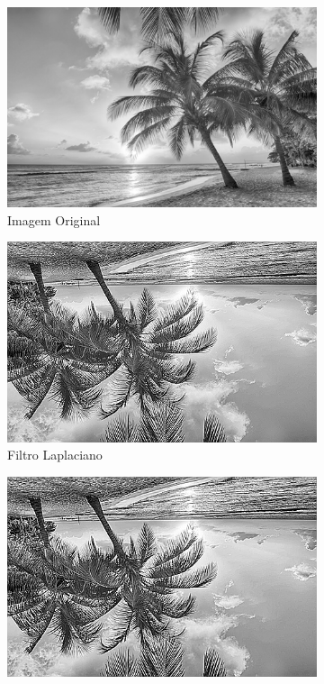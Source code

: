 \documentclass{article}
\begin{document}
\begin{figure}[H]
    \centering
    \begin{subfigure}[b]{0.3\textwidth}
        \includegraphics[width=\textwidth]{../imags/praia.png}
        \caption{Imagem Original}
        \label{fig:original_praia}
    \end{subfigure}
    \hfill
    \begin{subfigure}[b]{0.3\textwidth}
        \includegraphics[width=\textwidth, angle=180]{../imags/praia_laplacian.png}
        \caption{Filtro Laplaciano}
        \label{fig:laplacian_praia}
    \end{subfigure}
    \hfill
    \begin{subfigure}[b]{0.3\textwidth}
        \includegraphics[width=\textwidth, angle=180]{../imags/praia_high-boost.png}

\end{subfigure}
\end{figure}
\end{document}
